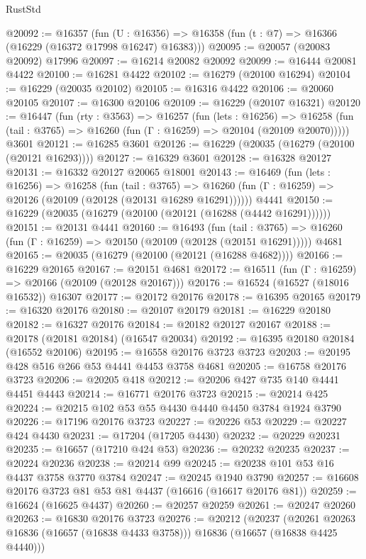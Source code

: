 \begin{lexlean}{RustStd}
\begin{coremodule}
@20092 := @16357
    (fun (U : @16356) => @16358 (fun (t : @7) => @16366 (@16229 (@16372 @17998 @16247) @16383)))
@20095 := @20057 (@20083 @20092) @17996
@20097 := @16214 @20082 @20092
@20099 := @16444 @20081 @4422
@20100 := @16281 @4422
@20102 := @16279 (@20100 @16294)
@20104 := @16229 (@20035 @20102)
@20105 := @16316 @4422
@20106 := @20060 @20105
@20107 := @16300 @20106
@20109 := @16229 (@20107 @16321)
@20120 := @16447
    (fun (rty : @3563) =>
    @16257
      (fun (lets : @16256) =>
      @16258 (fun (tail : @3765) => @16260 (fun (Γ : @16259) => @20104 (@20109 @20070)))))
    @3601
@20121 := @16285 @3601
@20126 := @16229 (@20035 (@16279 (@20100 (@20121 @16293))))
@20127 := @16329 @3601
@20128 := @16328 @20127
@20131 := @16332 @20127 @20065 @18001
@20143 := @16469
    (fun (lets : @16256) =>
    @16258
      (fun (tail : @3765) =>
      @16260 (fun (Γ : @16259) => @20126 (@20109 (@20128 (@20131 @16289 @16291))))))
    @4441
@20150 := @16229 (@20035 (@16279 (@20100 (@20121 (@16288 (@4442 @16291))))))
@20151 := @20131 @4441
@20160 := @16493
    (fun (tail : @3765) => @16260 (fun (Γ : @16259) => @20150 (@20109 (@20128 (@20151 @16291)))))
    @4681
@20165 := @20035 (@16279 (@20100 (@20121 (@16288 @4682))))
@20166 := @16229 @20165
@20167 := @20151 @4681
@20172 := @16511 (fun (Γ : @16259) => @20166 (@20109 (@20128 @20167)))
@20176 := @16524 (@16527 (@18016 @16532)) @16307
@20177 := @20172 @20176
@20178 := @16395 @20165
@20179 := @16320 @20176
@20180 := @20107 @20179
@20181 := @16229 @20180
@20182 := @16327 @20176
@20184 := @20182 @20127 @20167
@20188 := @20178 (@20181 @20184) (@16547 @20034)
@20192 := @16395 @20180 @20184 (@16552 @20106)
@20195 := @16558 @20176 @3723 @3723
@20203 := @20195 @428 @516 @266 @53 @4441 @4453 @3758 @4681
@20205 := @16758 @20176 @3723
@20206 := @20205 @418
@20212 := @20206 @427 @735 @140 @4441 @4451 @4443
@20214 := @16771 @20176 @3723
@20215 := @20214 @425
@20224 := @20215 @102 @53 @55 @4430 @4440 @4450 @3784 @1924 @3790
@20226 := @17196 @20176 @3723
@20227 := @20226 @53
@20229 := @20227 @424 @4430
@20231 := @17204 (@17205 @4430)
@20232 := @20229 @20231
@20235 := @16657 (@17210 @424 @53)
@20236 := @20232 @20235
@20237 := @20224 @20236
@20238 := @20214 @99
@20245 := @20238 @101 @53 @16 @4437 @3758 @3770 @3784
@20247 := @20245 @1940 @3790
@20257 := @16608 @20176 @3723 @81 @53 @81 @4437 (@16616 (@16617 @20176 @81))
@20259 := @16624 (@16625 @4437)
@20260 := @20257 @20259
@20261 := @20247 @20260
@20263 := @16830 @20176 @3723
@20276 := @20212
    (@20237
      (@20261 @20263 @16836 (@16657 (@16838 @4433 @3758)))
      @16836
      (@16657 (@16838 @4425 @4440)))

\end{coremodule}
\end{lexlean}
